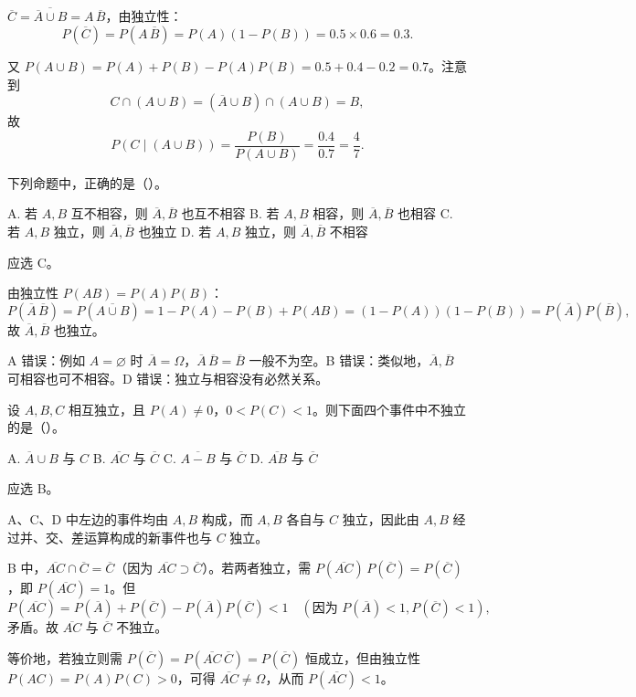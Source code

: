 ﻿\documentclass[lang=cn,11pt]{elegantbook}
\begin{document}
\begin{solution}
\(\overline{C}=\overline{\overline{A}\cup B}=A\,\overline{B}\)，由独立性：
\[
P(\overline{C}) = P(A\,\overline{B}) = P(A)(1-P(B)) = 0.5\times 0.6 = 0.3.
\]

又 \(P(A\cup B)=P(A)+P(B)-P(A)P(B)=0.5+0.4-0.2=0.7\)。注意到
\[
C\cap(A\cup B) = (\overline{A}\cup B)\cap(A\cup B) = B,
\]
故
\[
P(C\mid(A\cup B)) = \frac{P(B)}{P(A\cup B)} = \frac{0.4}{0.7} = \frac{4}{7}.
\]
\end{solution}

\begin{exercise}\label{exer:1-57}
下列命题中，正确的是（\quad）。\par
A. 若 \(A,B\) 互不相容，则 \(\overline{A},\overline{B}\) 也互不相容\quad
B. 若 \(A,B\) 相容，则 \(\overline{A},\overline{B}\) 也相容\quad
C. 若 \(A,B\) 独立，则 \(\overline{A},\overline{B}\) 也独立\quad
D. 若 \(A,B\) 独立，则 \(\overline{A},\overline{B}\) 不相容
\end{exercise}

\begin{solution}
应选 C。

由独立性 \(P(AB)=P(A)P(B)\)：
\[
P(\overline{A}\,\overline{B}) = P(\overline{A\cup B}) = 1-P(A)-P(B)+P(AB) = (1-P(A))(1-P(B)) = P(\overline{A})P(\overline{B}),
\]
故 \(\overline{A},\overline{B}\) 也独立。

A 错误：例如 \(A=\varnothing\) 时 \(\overline{A}=\Omega\)，\(\overline{A}\,\overline{B}=\overline{B}\) 一般不为空。B 错误：类似地，\(\overline{A},\overline{B}\) 可相容也可不相容。D 错误：独立与相容没有必然关系。
\end{solution}


\begin{exercise}[提高]\label{exer:1-58}
设 \(A,B,C\) 相互独立，且 \(P(A)\neq 0\)，\(0<P(C)<1\)。则下面四个事件中不独立的是（\quad）。\par
A. \(\overline{A}\cup B\) 与 \(C\)\quad
B. \(\overline{AC}\) 与 \(\overline{C}\)\quad
C. \(\overline{A-B}\) 与 \(\overline{C}\)\quad
D. \(\overline{AB}\) 与 \(\overline{C}\)
\end{exercise}

\begin{solution}
应选 B。

A、C、D 中左边的事件均由 \(A,B\) 构成，而 \(A,B\) 各自与 \(C\) 独立，因此由 \(A,B\) 经过并、交、差运算构成的新事件也与 \(C\) 独立。

B 中，\(\overline{AC}\cap\overline{C}=\overline{C}\)（因为 \(\overline{AC}\supset\overline{C}\)）。若两者独立，需 \(P(\overline{AC})\,P(\overline{C})=P(\overline{C})\)，即 \(P(\overline{AC})=1\)。但
\[
P(\overline{AC}) = P(\overline{A})+P(\overline{C})-P(\overline{A})P(\overline{C}) < 1 \quad (\text{因为 }P(\overline{A})<1, P(\overline{C})<1),
\]
矛盾。故 \(\overline{AC}\) 与 \(\overline{C}\) 不独立。

等价地，若独立则需 \(P(\overline{C})=P(\overline{AC}\,\overline{C})=P(\overline{C})\) 恒成立，但由独立性 \(P(AC)=P(A)P(C)>0\)，可得 \(\overline{AC}\neq\Omega\)，从而 \(P(\overline{AC})<1\)。
\end{solution}
\end{document}
